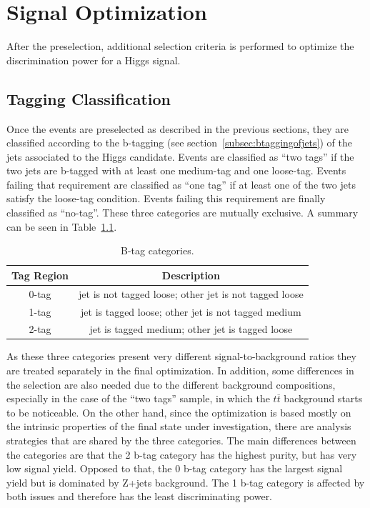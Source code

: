 

\chapter{Signal Optimization}


After the preselection, additional selection criteria is performed to optimize the discrimination power for a Higgs signal.

\section{Tagging Classification}

Once the events are preselected as described in the previous sections, they are classified according to the b-tagging (see section~\ref{subsec:btaggingofjets})  of the jets associated to the Higgs candidate. Events are classified as ``two tags'' if the two jets are b-tagged with at least one medium-tag and one loose-tag. Events failing that requirement are classified as ``one tag'' if at least one of the two jets satisfy the loose-tag condition. Events failing this requirement are finally classified as ``no-tag''.  These three categories are mutually exclusive.  A summary can be seen in Table~\ref{tab:btagcateg}.

\begin{table}[htb!]
\caption{ 
B-tag categories.
}
\label{tab:btagcateg}
\vspace*{\medskipamount}
\begin{center}
\small
\begin{tabular}{|c|c|}
\hline
Tag Region & Description\\
\hline
0-tag & jet is not tagged loose; other jet is not tagged loose \\
1-tag & jet is tagged loose; other jet is not tagged medium \\
2-tag & jet is tagged medium; other jet is tagged loose \\
\hline
\end{tabular}
\end{center}
\end{table}

As these three categories present very different signal-to-background ratios they are treated separately in the final optimization. In addition, some differences in the selection are also needed due to the different background compositions, especially in the case of the ``two tags'' sample, in which the $t\overline{t}$ background starts to be noticeable. On the other hand, since the optimization is based mostly on the intrinsic properties of the final state under investigation, there are analysis strategies that are shared by the three categories. The main differences between the categories are that the 2 b-tag category has the highest purity, but has very low signal yield.  Opposed to that, the 0 b-tag category has the largest signal yield but is dominated by Z+jets background. The 1 b-tag category is affected by both issues and therefore has the least discriminating power.

